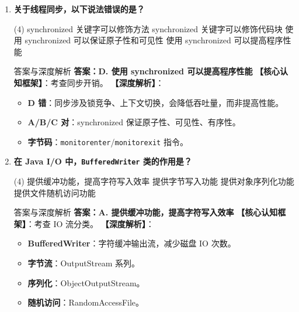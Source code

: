 \documentclass[12pt, a4paper]{ctexart}
\newcommand{\code}[1]{\texttt{#1}}
\begin{document}
\begin{enumerate}[label=\textbf{\arabic*.}, leftmargin=*, itemsep=1.5em]
\item \textbf{关于线程同步，以下说法错误的是？}
\begin{tasks}(4)
    \task synchronized 关键字可以修饰方法 \task synchronized 关键字可以修饰代码块
    \task 使用 synchronized 可以保证原子性和可见性 \task 使用 synchronized 可以提高程序性能
\end{tasks}
\begin{bluebox}{答案与深度解析}
\textbf{答案：D. 使用 synchronized 可以提高程序性能}
\textbf{【核心认知框架】}：考查同步开销。
\textbf{【深度解析】}：
\begin{itemize}[leftmargin=*, nosep]
    \item \textbf{D 错}：同步涉及锁竞争、上下文切换，会降低吞吐量，而非提高性能。
    \item \textbf{A/B/C 对}：synchronized 保证原子性、可见性、有序性。
    \item \textbf{字节码}：\code{monitorenter}/\code{monitorexit} 指令。
\end{itemize}
\end{bluebox}

\item \textbf{在 Java I/O 中，\code{BufferedWriter} 类的作用是？}
\begin{tasks}(4)
    \task 提供缓冲功能，提高字符写入效率 \task 提供字节写入功能
    \task 提供对象序列化功能 \task 提供文件随机访问功能
\end{tasks}
\begin{bluebox}{答案与深度解析}
\textbf{答案：A. 提供缓冲功能，提高字符写入效率}
\textbf{【核心认知框架】}：考查 IO 流分类。
\textbf{【深度解析】}：
\begin{itemize}[leftmargin=*, nosep]
    \item \textbf{BufferedWriter}：字符缓冲输出流，减少磁盘 IO 次数。
    \item \textbf{字节流}：OutputStream 系列。
    \item \textbf{序列化}：ObjectOutputStream。
    \item \textbf{随机访问}：RandomAccessFile。
\end{itemize}
\end{bluebox}


\end{enumerate}
\end{document}
